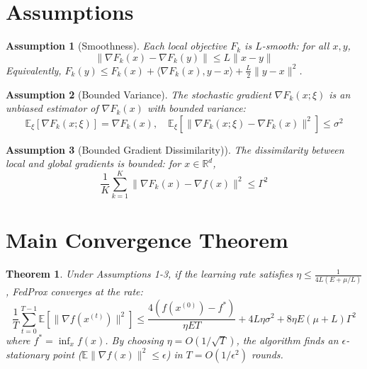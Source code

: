 \documentclass{article}
\newtheorem{theorem}{Theorem}
\newtheorem{assumption}{Assumption}
\begin{document}
\newpage
\section*{Assumptions}
\begin{assumption}[Smoothness]
Each local objective $F_k$ is $L$-smooth: for all $x, y$,
$$ \|\nabla F_k(x) - \nabla F_k(y)\| \leq L \|x - y\| $$
Equivalently, $F_k(y) \leq F_k(x) + \langle \nabla F_k(x), y - x \rangle + \frac{L}{2} \|y - x\|^2$.
\end{assumption}

\begin{assumption}[Bounded Variance]
The stochastic gradient $\nabla F_k(x; \xi)$ is an unbiased estimator of $\nabla F_k(x)$ with bounded variance:
$$ \mathbb{E}_{\xi}[\nabla F_k(x; \xi)] = \nabla F_k(x), \quad \mathbb{E}_{\xi}[\|\nabla F_k(x; \xi) - \nabla F_k(x)\|^2] \leq \sigma^2 $$
\end{assumption}

\begin{assumption}[Bounded Gradient Dissimilarity)]
The dissimilarity between local and global gradients is bounded: for $x \in \mathbb{R}^d$,
$$ \frac{1}{K} \sum_{k=1}^K \|\nabla F_k(x) - \nabla f(x)\|^2 \leq \Gamma^2 $$
\end{assumption}

\section*{Main Convergence Theorem}
\begin{theorem}
Under Assumptions 1-3, if the learning rate satisfies $\eta \leq \frac{1}{4L(E + \mu/L)}$, FedProx converges at the rate:
$$ \frac{1}{T} \sum_{t=0}^{T-1} \mathbb{E}[\|\nabla f(x^{(t)})\|^2] \leq \frac{4(f(x^{(0)}) - f^*)}{\eta E T} + 4L\eta\sigma^2 + 8\eta E (\mu + L) \Gamma^2 $$
where $f^* = \inf_x f(x)$. By choosing $\eta = O(1/\sqrt{T})$, the algorithm finds an $\epsilon$-stationary point ($\mathbb{E}\|\nabla f(x)\|^2 \leq \epsilon$) in $T = O(1/\epsilon^2)$ rounds.
\end{theorem}
\end{document}

